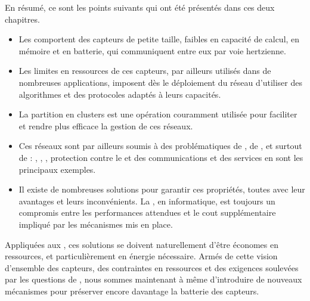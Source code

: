 En résumé, ce sont les points suivants qui ont été présentés dans ces deux chapitres.
\begin{itemize}
    \item Les \rcsfs comportent des capteurs de petite taille, faibles en capacité de calcul, en mémoire et en batterie, qui communiquent entre eux par voie hertzienne.
    \item Les limites en ressources de ces capteurs, par ailleurs utilisés dans de nombreuses applications, imposent dès le déploiement du réseau d'utiliser des algorithmes et des protocoles adaptés à leurs capacités.
    \item La partition en clusters est une opération couramment utilisée pour faciliter et rendre plus efficace la gestion de ces réseaux.
    \item Ces réseaux sont par ailleurs soumis à des problématiques de , de , et surtout de \secu: , , , protection contre le  et  des communications et des services en sont les principaux exemples.
    \item Il existe de nombreuses solutions pour garantir ces propriétés, toutes avec leur avantages et leurs inconvénients. La \secu, en informatique, est toujours un compromis entre les performances attendues et le cout supplémentaire impliqué par les mécanismes mis en place.
\end{itemize}
Appliquées aux \rcs, ces solutions se doivent naturellement d'être économes en ressources, et particulièrement en énergie nécessaire.
Armés de cette vision d'ensemble des capteurs, des contraintes en ressources et des exigences soulevées par les questions de \secu, nous sommes maintenant à même d'introduire de nouveaux mécanismes pour préserver encore davantage la batterie des capteurs.
